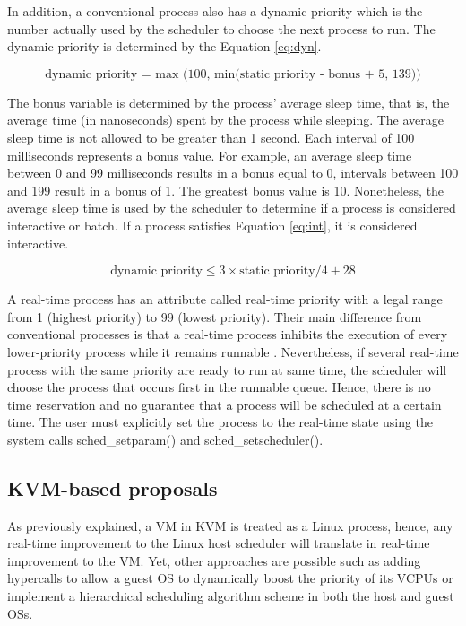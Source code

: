 In addition, a conventional process also has a dynamic priority which is the number actually used by the scheduler to choose the next process to run. The dynamic priority is determined by the Equation \ref{eq:dyn}. 

\begin{equation}
\label{eq:dyn}
\text{dynamic priority = max (100, min(static priority - bonus + 5, 139))}
\end{equation}

The bonus variable is determined by the process'  average sleep time, that is, the average time (in nanoseconds) spent by the process while sleeping. The average sleep time is not allowed to be greater than 1 second. Each interval of 100 milliseconds represents a bonus value. For example, an average sleep time between 0 and 99 milliseconds results in a bonus equal to 0, intervals between 100 and 199 result in a bonus of 1. The greatest bonus value is 10. Nonetheless, the average sleep time is used by the scheduler to determine if a process is considered interactive or batch. If a process satisfies Equation \ref{eq:int}, it is considered interactive.

\begin{equation}
\label{eq:int}
\text{dynamic priority} \leq  \text{3} \times \text{static priority} / \text{4} + \text{28}
\end{equation}

A real-time process has an attribute called real-time priority with a legal range from 1 (highest priority) to 99 (lowest priority). Their main difference from conventional processes is that a real-time process inhibits the execution of every lower-priority process while it remains runnable \cite{bovet}. Nevertheless, if several real-time process with the same priority are ready to run at same time, the scheduler will choose the process that occurs first in the runnable queue. Hence, there is no time reservation and no guarantee that a process will be scheduled at a certain time. The user must explicitly set the process to the real-time state using the system calls sched\_setparam() and sched\_setscheduler().


\subsection{KVM-based proposals}
\label{subsection:kvmproposals}

As previously explained, a VM in KVM is treated as a Linux process, hence, any real-time improvement to the Linux host scheduler will translate in real-time improvement to the VM. Yet, other approaches are possible such as adding hypercalls to allow a guest OS to dynamically boost the priority of its VCPUs or implement a hierarchical scheduling algorithm scheme in both the host and guest OSs. 

